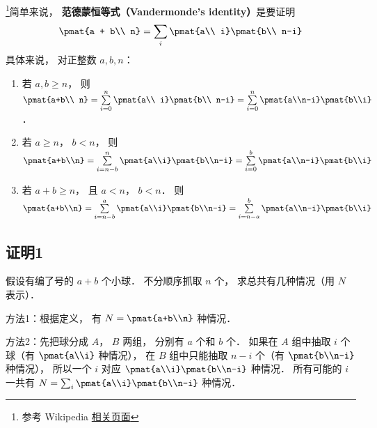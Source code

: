 

\footnote{参考 Wikipedia \href{https://en.wikipedia.org/wiki/Vandermonde's_identity}{相关页面}}简单来说， \textbf{范德蒙恒等式（Vandermonde's identity）}是要证明
\begin{equation}
\pmat{a + b\\ n} = \sum_i \pmat{a\\ i} \pmat{b\\ n-i}
\end{equation}
具体来说， 对正整数 $a,b,n$：
\begin{enumerate}
\item 若 $a,b \geqslant n$，  则 $\pmat{a+b\\ n} = \sum\limits_{i = 0}^n \pmat{a\\ i} \pmat{b\\ n-i} = \sum\limits_{i = 0}^n \pmat{a\\n-i}\pmat{b\\i}$． 
\item 若 $a \geqslant n$，  $b < n$，   则  $\pmat{a+b\\n} = \sum\limits_{i = n - b}^n \pmat{a\\i}\pmat{b\\n-i} = \sum\limits_{i = 0}^b \pmat{a\\n-i} \pmat{b\\i}$ 
\item 若 $a + b \geqslant n$，   且 $a < n$，   $b < n$．  则  $\pmat{a+b\\n} = \sum\limits_{i = n - b}^a \pmat{a\\i} \pmat{b\\n-i} = \sum\limits_{i = n - a}^b \pmat{a\\n-i} \pmat{b\\i}$ 
\end{enumerate}

\subsection{证明1}

假设有编了号的 $a+b$ 个小球． 不分顺序抓取 $n$ 个， 求总共有几种情况（用 $N$ 表示）．

方法1：根据定义， 有 $N = \pmat{a+b\\n}$ 种情况．

方法2：先把球分成 $A$，  $B$ 两组， 分别有 $a$ 个和 $b$ 个． 如果在 $A$ 组中抽取 $i$ 个球（有 $\pmat{a\\i}$ 种情况）， 在 $B$ 组中只能抽取  $n - i$ 个（有 $\pmat{b\\n-i}$ 种情况）， 所以一个 $i$ 对应 $\pmat{a\\i} \pmat{b\\n-i}$ 种情况． 所有可能的 $i$ 一共有 $N = \sum_i \pmat{a\\i} \pmat{b\\n-i}$ 种情况．

